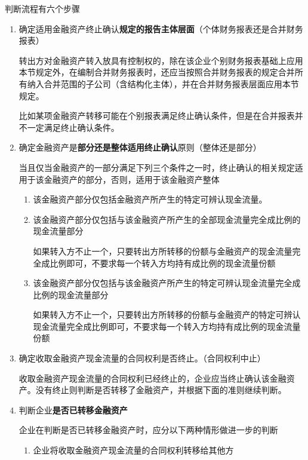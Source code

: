 \documentclass[UTF8,12pt]{ctexart}
\numberwithin{equation}{section} %
\numberwithin{figure}{section}
\numberwithin{table}{section}
\begin{document}
	判断流程有六个步骤
	\begin{enumerate}
		\item 确定适用金融资产终止确认\textbf{规定的报告主体层面}（个体财务报表还是合并财务报表）
		
		转出方对金融资产转入放具有控制权的，除在该企业个别财务报表基础上应用本节规定外，在编制合并财务报表时，还应当按照合并财务报表的规定合并所有纳入合并范围的子公司（含结构化主体），并在合并财务报表层面应用本节规定。
		
		比如某项金融资产转移可能在个别报表满足终止确认条件，但是在合并报表并不一定满足终止确认条件。
		
		\item 确定金融资产是\textbf{部分还是整体适用终止确认}原则（整体还是部分）
		
		当且仅当金融资产的一部分满足下列三个条件之一时，终止确认的相关规定适用于该金融资产的部分，否则，适用于该金融资产整体
		\begin{enumerate}
			\item 该金融资产部分仅包括金融资产所产生的特定可辨认现金流量。
			
			\item 该金融资产部分仅包括与该金融资产所产生的全部现金流量完全成比例的现金流量部分
			
			如果转入方不止一个，只要转出方所转移的份额与金融资产的现金流量完全成比例即可，不要求每一个转入方均持有成比例的现金流量份额
			
			\item 该金融资产部分仅包括与该金融资产所产生的特定可辨认现金流量完全成比例的现金流量部分
			
			如果转入方不止一个，只要转出方所转移的份额与金融资产的特定可辨认现金流量完全成比例即可，不要求每一个转入方均持有成比例的现金流量份额
			
		\end{enumerate}
		
		\item 确定收取金融资产现金流量的合同权利是否终止。（合同权利中止）
		
		收取金融资产现金流量的合同权利已经终止的，企业应当终止确认该金融资产。没有终止则判断是否转移了金融资产，并根据下面的准则继续判断。
		
		\item 判断企业\textbf{是否已转移金融资产}
		
		企业在判断是否已转移金融资产时，应分以下两种情形做进一步的判断
		\begin{enumerate}
			\item 企业将收取金融资产现金流量的合同权利转移给其他方
			

\end{enumerate}
\end{enumerate}
\end{document}
